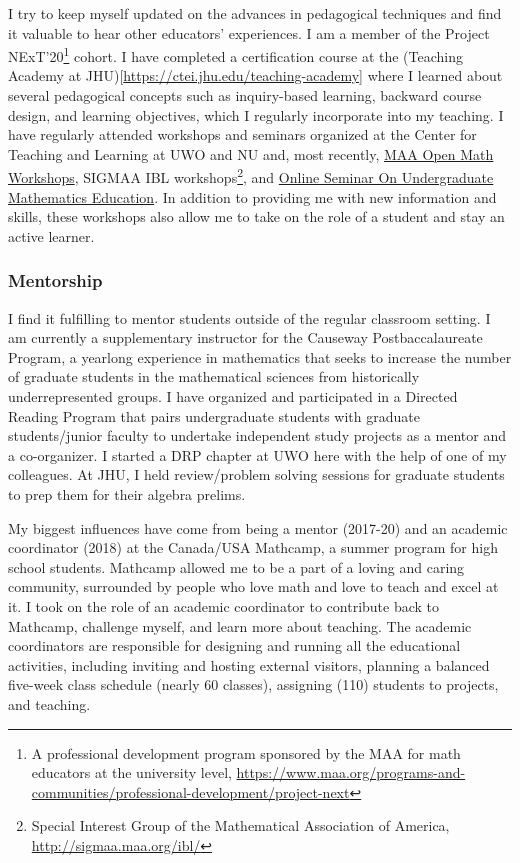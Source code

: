 \documentclass[
]{report}
\begin{document}
I try to keep myself updated on the advances in pedagogical techniques and find it valuable to hear other educators' experiences. I am a member of the Project NExT'20\footnote{A professional development program sponsored by the MAA for math educators at the university level, \url{https://www.maa.org/programs-and-communities/professional-development/project-next}} cohort. I have completed a certification course at the (Teaching Academy at JHU){[}\url{https://ctei.jhu.edu/teaching-academy}{]} where I learned about several pedagogical concepts such as inquiry-based learning, backward course design, and learning objectives, which I regularly incorporate into my teaching. I have regularly attended workshops and seminars organized at the Center for Teaching and Learning at UWO and NU and, most recently, \href{https://www.maa.org/programs-and-communities/professional-development/open-math}{MAA Open Math Workshops}, SIGMAA IBL workshops\footnote{Special Interest Group of the Mathematical Association of America, \url{http://sigmaa.maa.org/ibl/}}, and \href{https://olsume.org/}{Online Seminar On Undergraduate Mathematics Education}.
In addition to providing me with new information and skills, these workshops also allow me to take on the role of a student and stay an active learner.

\hypertarget{mentorship}{%
\subsubsection*{Mentorship}\label{mentorship}}


I find it fulfilling to mentor students outside of the regular classroom setting.
I am currently a supplementary instructor for the Causeway Postbaccalaureate Program, a yearlong experience in mathematics that seeks to increase the number of graduate students in the mathematical sciences from historically underrepresented groups. I have organized and participated in a Directed Reading Program that pairs undergraduate students with graduate students/junior faculty to undertake independent study projects as a mentor and a co-organizer. I started a DRP chapter at UWO here with the help of one of my colleagues. At JHU, I held review/problem solving sessions for graduate students to prep them for their algebra prelims.

My biggest influences have come from being a mentor (2017-20) and an academic coordinator (2018) at the Canada/USA Mathcamp, a summer program for high school students. Mathcamp allowed me to be a part of a loving and caring community, surrounded by people who love math and love to teach and excel at it. I took on the role of an academic coordinator to contribute back to Mathcamp, challenge myself, and learn more about teaching. The academic coordinators are responsible for designing and running all the educational activities, including inviting and hosting external visitors, planning a balanced five-week class schedule (nearly 60 classes), assigning (110) students to projects, and teaching.
\end{document}
